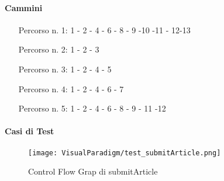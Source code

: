 \paragraph{Cammini}
\begin{itemize}
\item[Percorso n. 1: ] 1 - 2 - 4 - 6 - 8 - 9 -10 -11 - 12-13
\item[Percorso n. 2: ] 1 - 2 - 3
\item[Percorso n. 3: ] 1 - 2 - 4 - 5
\item[Percorso n. 4: ] 1 - 2 - 4 - 6 - 7  
\item[Percorso n. 5: ] 1 - 2 - 4 - 6 - 8 - 9 - 11 -12
\end{itemize}
\paragraph{Casi di Test}
\begin{figure}[ht]
  \centering
  \texttt{[image: VisualParadigm/test\_submitArticle.png]}
  \caption{Control Flow Grap di submitArticle}
  \label{fig:cfg_submitArticle }
\end{figure}

